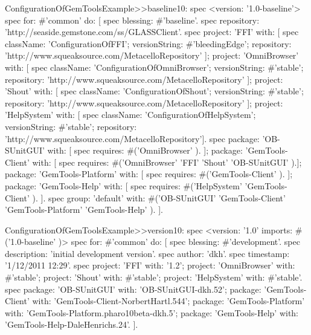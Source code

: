 \documentclass[a4paper,10pt,twoside]{book}
\begin{document}
\begin{footnotesize}
\begin{code}{}
ConfigurationOfGemToolsExample>>baseline10: spec
  <version: '1.0-baseline'>
  spec for: #'common' do: [
     spec blessing: #'baseline'.
     spec repository: 'http://seaside.gemstone.com/ss/GLASSClient'.
     spec
        project: 'FFI' with: [
          spec
             className: 'ConfigurationOfFFI';
             versionString: #'bleedingEdge';
             repository: 'http://www.squeaksource.com/MetacelloRepository' ];
        project: 'OmniBrowser' with: [
          spec
             className: 'ConfigurationOfOmniBrowser';
             versionString: #'stable';
             repository: 'http://www.squeaksource.com/MetacelloRepository' ];
        project: 'Shout' with: [
          spec
             className: 'ConfigurationOfShout';
             versionString: #'stable';
             repository: 'http://www.squeaksource.com/MetacelloRepository' ];
        project: 'HelpSystem' with: [
          spec
             className: 'ConfigurationOfHelpSystem';
             versionString: #'stable';
             repository: 'http://www.squeaksource.com/MetacelloRepository'].
     spec
        package: 'OB-SUnitGUI' with: [
          spec requires: #('OmniBrowser' ). ];
        package: 'GemTools-Client' with: [
          spec requires: #('OmniBrowser' 'FFI' 'Shout' 'OB-SUnitGUI' ).];
        package: 'GemTools-Platform' with: [
          spec requires: #('GemTools-Client' ). ];
        package: 'GemTools-Help' with: [
          spec requires: #('HelpSystem' 'GemTools-Client' ). ].
     spec group: 'default' with: #('OB-SUnitGUI' 'GemTools-Client'
             'GemTools-Platform' 'GemTools-Help' ). ].
\end{code}         
\end{footnotesize} 

\begin{footnotesize}
\begin{code}{}
ConfigurationOfGemToolsExample>>version10: spec
     <version: '1.0' imports: #('1.0-baseline' )>
     spec for: #'common' do: [
          spec blessing: #'development'.
          spec description: 'initial development version'.
          spec author: 'dkh'.
          spec timestamp: '1/12/2011 12:29'.
     spec 
          project: 'FFI' with: '1.2';
          project: 'OmniBrowser' with: #'stable';
          project: 'Shout' with: #'stable';
          project: 'HelpSystem' with: #'stable'.
     spec
          package: 'OB-SUnitGUI' with: 'OB-SUnitGUI-dkh.52';
          package: 'GemTools-Client' with: 'GemTools-Client-NorbertHartl.544';
          package: 'GemTools-Platform' with: 'GemTools-Platform.pharo10beta-dkh.5';
          package: 'GemTools-Help' with: 'GemTools-Help-DaleHenrichs.24'. ].
\end{code}
\end{footnotesize} 
\ifx\wholebook\relax\else
    
    
\end{document}

